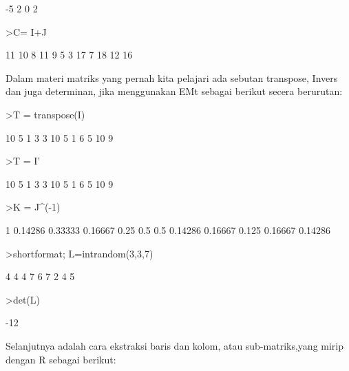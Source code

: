 \documentclass[a4paper,10pt]{article}
\begin{document}
\begin{eulernotebook}
\begin{eulercomment}
\begin{eulercomment}
\begin{eulercomment}
\begin{eulercomment}
\begin{eulercomment}
\begin{eulercomment}
\begin{eulercomment}
\begin{eulercomment}
\begin{eulercomment}
\begin{eulercomment}
\begin{euleroutput}
         -5         2         0         2 
\end{euleroutput}
\begin{eulerprompt}
>C= I+J
\end{eulerprompt}
\begin{euleroutput}
         11        10         8        11 
          9         5         3        17 
          7        18        12        16 
\end{euleroutput}
\begin{eulercomment}
Dalam materi matriks yang pernah kita pelajari ada sebutan transpose,
Invers dan juga determinan, jika menggunakan EMt sebagai berikut
secera berurutan:
\end{eulercomment}
\begin{eulerprompt}
>T = transpose(I)
\end{eulerprompt}
\begin{euleroutput}
         10         5         1 
          3         3        10 
          5         1         6 
          5        10         9 
\end{euleroutput}
\begin{eulerprompt}
>T = I'
\end{eulerprompt}
\begin{euleroutput}
         10         5         1 
          3         3        10 
          5         1         6 
          5        10         9 
\end{euleroutput}
\begin{eulerprompt}
>K = J^(-1)
\end{eulerprompt}
\begin{euleroutput}
          1   0.14286   0.33333   0.16667 
       0.25       0.5       0.5   0.14286 
    0.16667     0.125   0.16667   0.14286 
\end{euleroutput}
\begin{eulerprompt}
>shortformat; L=intrandom(3,3,7)
\end{eulerprompt}
\begin{euleroutput}
          4         4         4 
          7         6         7 
          2         4         5 
\end{euleroutput}
\begin{eulerprompt}
>det(L)
\end{eulerprompt}
\begin{euleroutput}
  -12
\end{euleroutput}
\begin{eulercomment}
Selanjutnya adalah cara ekstraksi baris dan kolom, atau
sub-matriks,yang  mirip dengan R sebagai berikut:


\end{eulercomment}
\end{eulercomment}
\end{eulercomment}
\end{eulercomment}
\end{eulercomment}
\end{eulercomment}
\end{eulercomment}
\end{eulercomment}
\end{eulercomment}
\end{eulercomment}
\end{eulercomment}
\end{eulernotebook}
\end{document}
